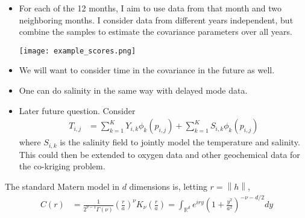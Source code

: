 \documentclass[11pt]{article}
\begin{document}
\begin{itemize}
\item For each of the 12 months, I aim to use data from that month and two neighboring months. I consider data from different years independent, but combine the samples to estimate the covariance parameters over all years. 

\texttt{[image: example\_scores.png]}

\item We will want to consider time in the covariance in the future as well. 
\item One can do salinity in the same way with delayed mode data.
\item Later future question. Consider \begin{align*}
T_{i,j} &= \sum_{k=1}^K Y_{i,k} \phi_k(p_{i,j}) +  \sum_{k=1}^K S_{i,k} \phi_k(p_{i,j})
\end{align*}where $S_{i,k}$ is the salinity field to jointly model the temperature and salinity. This could then be extended to oxygen data and other geochemical data for the co-kriging problem.
\end{itemize}



\pagebreak

The standard Matern model in $d$ dimensions is, letting $r = \left \lVert h\right\rVert$,  \begin{align*}
C(r) &=\frac{1}{2^{\nu-1}\Gamma(\nu)} \left(\frac{r}{a}\right)^{\nu} K_\nu\left(\frac{r}{a}\right) = \int_{\mathbb{R}^d}e^{iry} \left(1 + \frac{y^2}{a^2}\right)^{-\nu - d/2} dy
\end{align*}
\end{document}
